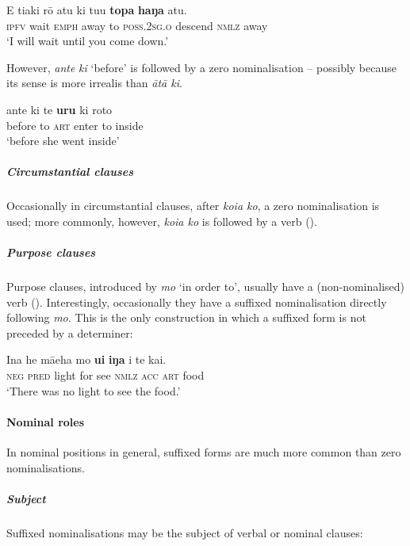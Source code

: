 \ea\label{ex:3.32}
\gll E tiaki rō atu ki tu{\ꞌ}u \textbf{topa} \textbf{haŋa} atu.\\
\textsc{ipfv} wait \textsc{emph} away to \textsc{poss.2sg.o} descend \textsc{nmlz} away\\

\glt
‘I will wait until you come down.’ \textstyleExampleref{[R230.047]} 
\z

However, \textit{ante} \textit{ki} ‘before’ is followed by a zero nominalisation – possibly because its sense is more irrealis than \textit{{\ꞌ}ātā ki}.

\ea\label{ex:3.33}
\gll ante ki te \textbf{uru} ki roto\\
before to \textsc{art} enter to inside\\

\glt
‘before she went inside’ \textstyleExampleref{[R181.005]} 
\z

\subparagraph{Circumstantial clauses} Occasionally in circumstantial clauses, after \textit{koia ko}, a zero nominalisation is used; more commonly, however, \textit{koia ko} is followed by a verb ().

\subparagraph{Purpose clauses} Purpose clauses, introduced by \textit{mo} ‘in order to’, usually have a (non-nominalised) verb (). Interestingly, occasionally they have a suffixed nominalisation directly following \textit{mo}. This is the only construction in which a suffixed form is not preceded by a determiner:

\ea\label{ex:3.34}
\gll {\ꞌ}Ina he mā{\ꞌ}eha mo \textbf{u{\ꞌ}i} \textbf{iŋa} i te kai.\\
\textsc{neg} \textsc{pred} light for see \textsc{nmlz} \textsc{acc} \textsc{art} food\\

\glt 
‘There was no light to see the food.’ \textstyleExampleref{[R352.070]} 
\z

\paragraph{Nominal roles}\label{sec:3.2.3.1.3} In nominal positions in general, suffixed forms are much more common than zero nominalisations.

\subparagraph{Subject} Suffixed nominalisations may be the subject of verbal or nominal clauses:

